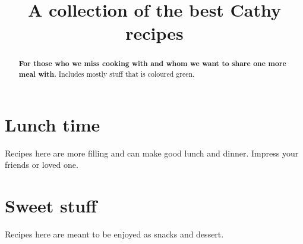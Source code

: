 \documentclass[%
a4paper,
11pt
]{article}
\begin{document}
\title{A collection of the best \textbf{Cathy} recipes}
\maketitle

\begin{abstract}
    \noindent \textbf{For those who we miss cooking with and whom we want to share one more meal with.} Includes mostly stuff that is coloured green.
\end{abstract}

\tableofcontents

\pagebreak


\section{Lunch time}
Recipes here are more filling and can make good lunch and dinner. Impress your friends or loved one.





\section{Sweet stuff}
Recipes here are meant to be enjoyed as snacks and dessert.



\end{document}
